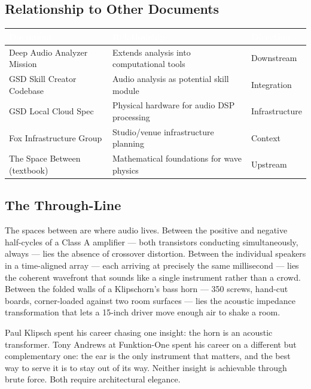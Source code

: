 \documentclass[11pt,letterpaper]{article}
\newcommand{\tableheader}[1]{\textbf{\sffamily\textcolor{white}{#1}}}
\begin{document}
\subsection{Relationship to Other Documents}

\begin{center}
\begin{tabularx}{\textwidth}{L{4cm}XC{2.5cm}}
\toprule
{}
\tableheader{Document} & \tableheader{Relationship} & \tableheader{Direction} \\
\midrule
Deep Audio Analyzer Mission & Extends analysis into computational tools & Downstream \\
GSD Skill Creator Codebase & Audio analysis as potential skill module & Integration \\
GSD Local Cloud Spec & Physical hardware for audio DSP processing & Infrastructure \\
Fox Infrastructure Group & Studio/venue infrastructure planning & Context \\
The Space Between (textbook) & Mathematical foundations for wave physics & Upstream \\
\bottomrule
\end{tabularx}
\end{center}

\subsection{The Through-Line}

The spaces between are where audio lives. Between the positive and negative half-cycles of a Class A amplifier --- both transistors conducting simultaneously, always --- lies the absence of crossover distortion. Between the individual speakers in a time-aligned array --- each arriving at precisely the same millisecond --- lies the coherent wavefront that sounds like a single instrument rather than a crowd. Between the folded walls of a Klipschorn's bass horn --- 350 screws, hand-cut boards, corner-loaded against two room surfaces --- lies the acoustic impedance transformation that lets a 15-inch driver move enough air to shake a room.

Paul Klipsch spent his career chasing one insight: the horn is an acoustic transformer. Tony Andrews at Funktion-One spent his career on a different but complementary one: the ear is the only instrument that matters, and the best way to serve it is to stay out of its way. Neither insight is achievable through brute force. Both require architectural elegance.
\end{document}
